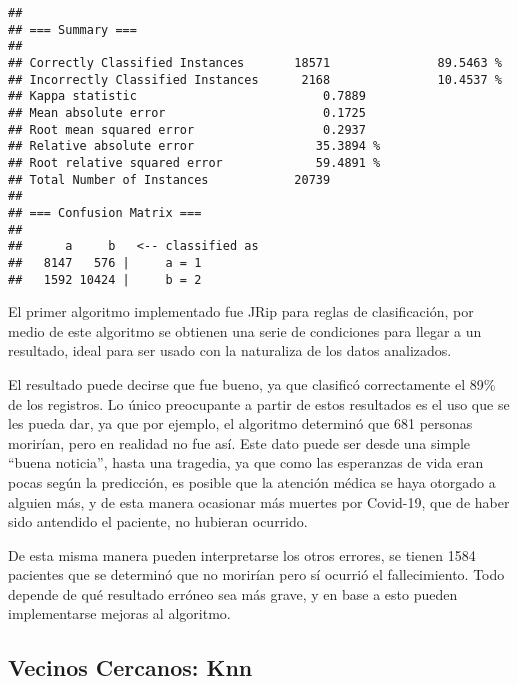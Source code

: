 \documentclass[]{article}
\begin{document}
\begin{verbatim}
## 
## === Summary ===
## 
## Correctly Classified Instances       18571               89.5463 %
## Incorrectly Classified Instances      2168               10.4537 %
## Kappa statistic                          0.7889
## Mean absolute error                      0.1725
## Root mean squared error                  0.2937
## Relative absolute error                 35.3894 %
## Root relative squared error             59.4891 %
## Total Number of Instances            20739     
## 
## === Confusion Matrix ===
## 
##      a     b   <-- classified as
##   8147   576 |     a = 1
##   1592 10424 |     b = 2
\end{verbatim}

El primer algoritmo implementado fue JRip para reglas de clasificación,
por medio de este algoritmo se obtienen una serie de condiciones para
llegar a un resultado, ideal para ser usado con la naturaliza de los
datos analizados.

El resultado puede decirse que fue bueno, ya que clasificó correctamente
el 89\% de los registros. Lo único preocupante a partir de estos
resultados es el uso que se les pueda dar, ya que por ejemplo, el
algoritmo determinó que 681 personas morirían, pero en realidad no fue
así. Este dato puede ser desde una simple ``buena noticia'', hasta una
tragedia, ya que como las esperanzas de vida eran pocas según la
predicción, es posible que la atención médica se haya otorgado a alguien
más, y de esta manera ocasionar más muertes por Covid-19, que de haber
sido antendido el paciente, no hubieran ocurrido.

De esta misma manera pueden interpretarse los otros errores, se tienen
1584 pacientes que se determinó que no morirían pero sí ocurrió el
fallecimiento. Todo depende de qué resultado erróneo sea más grave, y en
base a esto pueden implementarse mejoras al algoritmo.

\hypertarget{vecinos-cercanos-knn}{%
\subsection{Vecinos Cercanos: Knn}\label{vecinos-cercanos-knn}}
\end{document}
